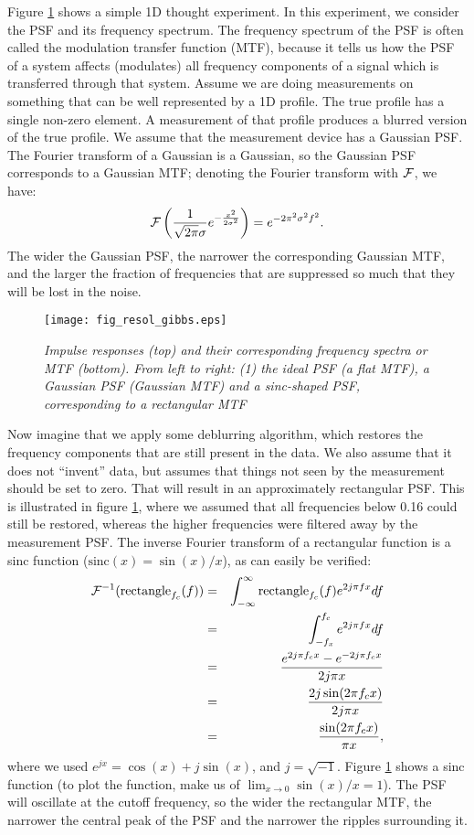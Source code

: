 Figure \ref{fig:resolgibbs} shows a simple 1D thought experiment. In
this experiment, we consider the PSF and its frequency spectrum. The
frequency spectrum of the PSF is often called the modulation transfer
function (MTF), because it tells us how the PSF of a system affects
(modulates) all frequency components of a signal which is transferred
through that system. Assume we are doing measurements on something
that can be well represented by a 1D profile. The true profile has a
single non-zero element. A measurement of that profile produces a
blurred version of the true profile. We assume that the measurement
device has a Gaussian PSF. The Fourier transform of a Gaussian is a
Gaussian, so the Gaussian PSF corresponds to a Gaussian MTF; denoting
the Fourier transform with ${\cal F}$, we have:
\begin{equation}
  {\cal F} \left( \frac{1}{\sqrt{2 \pi} \sigma}
     e^{-\frac{x^2}{2\sigma^2}} \right)
  = e^{- 2 \pi^2 \sigma^2 f^2}.
\end{equation}
The wider the Gaussian PSF, the narrower the corresponding Gaussian
MTF, and the larger the fraction of frequencies that are suppressed so
much that they will be lost in the noise.
%
\begin{figure}[htb]
\centering
\texttt{[image: fig\_resol\_gibbs.eps]}
\caption{\label{fig:resolgibbs} \emph{Impulse responses (top) and
    their corresponding frequency spectra or MTF (bottom). From left
    to right: (1) the ideal PSF (a flat MTF), a Gaussian PSF (Gaussian
    MTF) and a sinc-shaped PSF, corresponding to a rectangular MTF}}
\end{figure}
%
Now imagine that we apply some deblurring algorithm, which restores
the frequency components that are still present in the data. We also
assume that it does not ``invent'' data, but assumes that things not
seen by the measurement should be set to zero. That will result in an
approximately rectangular PSF. This is illustrated in figure
\ref{fig:resolgibbs}, where we assumed that all frequencies below 0.16
could still be restored, whereas the higher frequencies were filtered
away by the measurement PSF. The inverse Fourier transform of a
rectangular function is a sinc function ($\mbox{sinc}(x) =
\sin(x)/x$), as can easily be verified:
\begin{eqnarray}
  {\cal F}^{-1}(\mbox{rectangle}_{f_c}(f))
  &=& \int_{-\infty}^{\infty} \mbox{rectangle}_{f_c}(f) e^{2j\pi f x}
  df \nonumber\\
  &=& \int_{-f_x}^{f_c} e^{2j\pi f x} df \nonumber\\
  &=& \frac{e^{2j\pi f_c x} - e^{- 2j\pi f_c x}}{2j\pi x} \nonumber\\
  &=& \frac{2j \sin(2\pi f_c x)}{2j\pi x} \nonumber\\
  &=& \frac{\sin(2\pi f_c x)}{ \pi x},
\end{eqnarray}
where we used $e^{jx} = \cos(x) + j \sin(x)$, and $j =
\sqrt{-1}$. Figure \ref{fig:resolgibbs} shows a sinc function (to plot
the function, make us of $\lim_{x \rightarrow 0} \sin(x)/x = 1$). The PSF
will oscillate at the cutoff frequency, so the wider the rectangular
MTF, the narrower the central peak of the PSF and the narrower the
ripples surrounding it.

